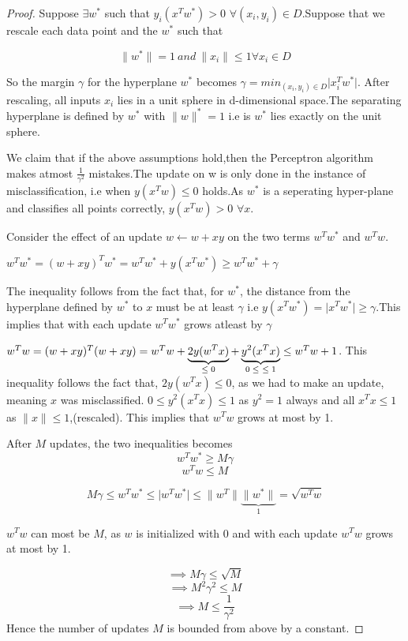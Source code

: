 \documentclass[12pt]{article}
\begin{document}
 \begin{proof}
 	Suppose $\exists w^{*}$ such that $ y_{i}(x^{T}w^{*}) > 0$ $ \forall (x_{i},y_{i}) \in D$.Suppose that we rescale each data point and the $w^{*}$ such that
 	
 	
 	$$\|w^{*}\| = 1 \ and \ \|x_{i}\| \leq 1 \forall x_{i} \in D $$
 	
    So the margin $\gamma$ for the hyperplane $w^{*}$ becomes $ \gamma = min_{(x_{i},y_{i})\in D} \vert x_{i}^{T}w^{*} \vert $. After rescaling, all inputs   $x_{i}$ lies in a unit sphere in d-dimensional space.The separating hyperplane is defined  by $w^{*}$ with $\|w\|^{*} = 1$ i.e is \textbf{$w^{*}$} lies exactly on the unit sphere.
    
    We claim that if the above assumptions hold,then the Perceptron algorithm makes atmost $\frac{1}{\gamma ^{2}}$ mistakes.The update on w is only done in the instance of misclassification, i.e when  $y(x^{T}w) \leq 0$ holds.As $w^{*}$ is a seperating hyper-plane and classifies all points correctly,  $y(x^{T}w)>0$ $ \forall x$.
    
     Consider the effect of an update $w \leftarrow w + xy $ on the two terms $w^{T}w^{*}$ and $w^{T}w$.
     
     $w^{T}w^{*} = (w+xy)^{T}w^{*} = w^{T}w^{*} + y(x^{T}w^{*}) \geq w^{T}w^{*} + \gamma $
        
    The inequality follows from the fact that, for $w^{*}$, the distance from the hyperplane defined by $w^{*}$ to $x$ must be at least $\gamma$ i.e
    $y(x^{T}w^{*}) = \vert x^{T}w^{*}\vert \geq \gamma$.This implies that with each update $w^{T}w^{*}$ grows atleast by $\gamma$
 
     $w^{T}w = (w+xy)^{T}(w+xy) = w^{T}w + \underbrace{2y(w^{T}x)}_\text{$ \leq 0$} + \underbrace{y^{2}(x^{T}x)}_\text{$0 \leq \ \leq 1$}  \leq
     w^{T}w + 1$.
     This inequality follows the fact that, $2y(w^{T}x) \leq 0$,  as we had to make an update, meaning $x$ was misclassified. $0 \leq y^{2}(x^{T}x) \leq 1$ as $y^{2}=1 $ always and all $x^{T}x \leq 1$ as $\|x\| \leq 1$,(rescaled). This implies that $w^{T}w$ grows at most by 1.
     
     
     
     After $M$ updates, the two inequalities becomes $$w^{T}w^{*} \geq M\gamma$$  $$w^{T}w \leq M$$
 
 $$M\gamma \leq w^{T}w^{*} \leq \vert w^{T}w^{*} \vert \leq \| w^{T} \| \underbrace{\|w^{*}\|}_\text{1}=\sqrt{w^{T}w}$$
 
 $w^{T}w$ can most be $M$, as $w$ is initialized with 0 and with each update $w^{T}w$ grows at most by 1.
 
 $$\implies M\gamma \leq \sqrt{M} $$
 $$\implies M^{2}\gamma^{2} \leq M$$
 $$\implies M \leq \frac{1}{\gamma ^{2}}$$  Hence the number of updates $M$ is bounded from above by a constant.
  
 
 	
 \end{proof}
 
\end{document}
